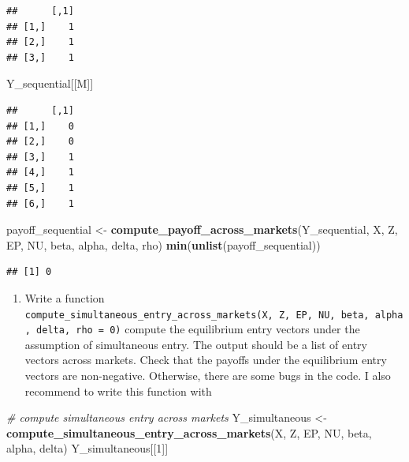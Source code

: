 \documentclass[]{book}
\newenvironment{Shaded}{\begin{snugshade}}{\end{snugshade}}
\newcommand{\KeywordTok}[1]{\textcolor[rgb]{0.13,0.29,0.53}{\textbf{#1}}}
\newcommand{\DecValTok}[1]{\textcolor[rgb]{0.00,0.00,0.81}{#1}}
\newcommand{\StringTok}[1]{\textcolor[rgb]{0.31,0.60,0.02}{#1}}
\newcommand{\CommentTok}[1]{\textcolor[rgb]{0.56,0.35,0.01}{\textit{#1}}}
\newcommand{\NormalTok}[1]{#1}
\providecommand{\tightlist}{%
  \setlength{\itemsep}{0pt}\setlength{\parskip}{0pt}}
\begin{document}
\begin{verbatim}
##      [,1]
## [1,]    1
## [2,]    1
## [3,]    1
\end{verbatim}

\begin{Shaded}
\begin{Highlighting}[]
\NormalTok{Y_sequential[[M]]}
\end{Highlighting}
\end{Shaded}

\begin{verbatim}
##      [,1]
## [1,]    0
## [2,]    0
## [3,]    1
## [4,]    1
## [5,]    1
## [6,]    1
\end{verbatim}

\begin{Shaded}
\begin{Highlighting}[]
\NormalTok{payoff_sequential <-}
\StringTok{  }\KeywordTok{compute_payoff_across_markets}\NormalTok{(Y_sequential, X, Z, EP, NU, beta, alpha, delta, rho)}
\KeywordTok{min}\NormalTok{(}\KeywordTok{unlist}\NormalTok{(payoff_sequential))}
\end{Highlighting}
\end{Shaded}

\begin{verbatim}
## [1] 0
\end{verbatim}

\begin{enumerate}
\def\labelenumi{\arabic{enumi}.}
\setcounter{enumi}{7}
\tightlist
\item
  Write a function
  \texttt{compute\_simultaneous\_entry\_across\_markets(X,\ Z,\ EP,\ NU,\ beta,\ alpha,\ delta,\ rho\ =\ 0)}
  compute the equilibrium entry vectors under the assumption of
  simultaneous entry. The output should be a list of entry vectors
  across markets. Check that the payoffs under the equilibrium entry
  vectors are non-negative. Otherwise, there are some bugs in the code.
  I also recommend to write this function with
\end{enumerate}

\begin{Shaded}
\begin{Highlighting}[]
\CommentTok{# compute simultaneous entry across markets}
\NormalTok{Y_simultaneous <-}
\StringTok{  }\KeywordTok{compute_simultaneous_entry_across_markets}\NormalTok{(X, Z, EP, NU, beta, alpha, delta)}
\NormalTok{Y_simultaneous[[}\DecValTok{1}\NormalTok{]]}
\end{Highlighting}
\end{Shaded}
\end{document}
